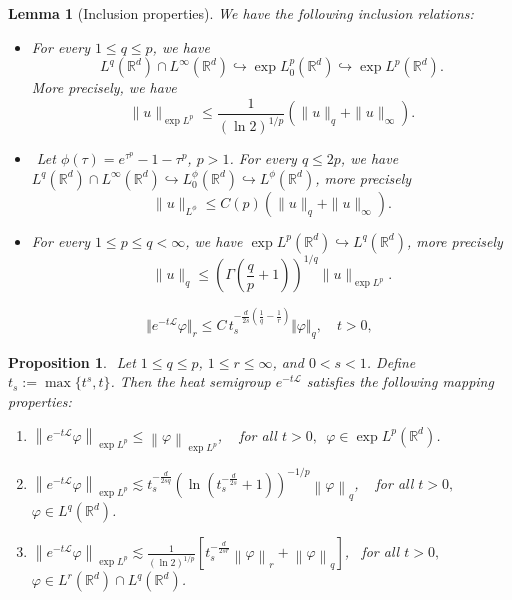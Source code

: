 \documentclass[10pt,a4paper]{amsart}
\newtheorem{lem}{Lemma}
\newtheorem{proposition}{Proposition}
\begin{document}
\begin{lem}[Inclusion properties]\label{lemma1} We have the following inclusion relations:

\begin{itemize}
\item[({1})] 
\cite[Lemma 2.3]{Majdoub2}
For every $1\leq q\leq p$, we have $$L^q(\mathbb{R}^d)\cap L^\infty(\mathbb{R}^d)\hookrightarrow \exp L^p_0(\mathbb{R}^d)\hookrightarrow \exp L^p(\mathbb{R}^d).$$ More precisely, we have 
\begin{equation}\label{eq6}
\|u\|_{\exp L^p}\leq\frac{1}{(\ln 2)^{1/p}}(\|u\|_q+\|u\|_\infty).
\end{equation}
\item[({2})] \cite[Lemma 2.3]{FK20}${}$
Let $\phi(\tau)=e^{\tau^p}-1-\tau^p$, $p>1$. For every $ q\leq 2p$, we have $L^q(\mathbb{R}^d)\cap L^\infty(\mathbb{R}^d)\hookrightarrow L^\phi_0(\mathbb{R}^d)\hookrightarrow L^\phi(\mathbb{R}^d)$, more precisely
$$
\|u\|_{ L^\phi}\leq C(p)(\|u\|_q+\|u\|_\infty).
$$
\item[({3})] \cite[Lemma 2.4]{Majdoub2}
For every $1\leq p\leq q<\infty$, we have $\exp L^p(\mathbb{R}^d)\hookrightarrow L^q(\mathbb{R}^d)$, more precisely
\begin{equation}\label{eq8}
\|u\|_q\leq\left(\Gamma\left(\frac{q}{p}+1\right)\right)^{1/q} \|u\|_{\exp L^p}.
\end{equation}
\end{itemize}
\end{lem}

\begin{equation} \label{pqbound}
\Vert e^{-t \mathcal{L}} \varphi \Vert_{r} \leq C\, t_s^{-\frac{d}{2s}(\frac{1}{q}-\frac{1}{r})}\Vert \varphi \Vert_{q},\quad t>0,
\end{equation}

\begin{proposition}\label{techprop1}${}$
Let $1\leq q\leq p$, $1\leq r\leq\infty$, and $0<s< 1$. Define $t_s:=\max\{t^s,t\}$. Then the heat semigroup $e^{-t \mathcal{L}}$ satisfies the following mapping properties:
\begin{enumerate}
\item $\left\|e^{-t\mathcal{L}} \varphi\right\|_{\exp L^p }\leq \left\|\varphi\right\|_{\exp L^p }$, \,\,\, for all $t>0,$\, $\varphi\in {\exp L^p(\mathbb{R}^d)}$.

\item $\left\|e^{-t\mathcal{L}} \varphi\right\|_{\exp L^p }\lesssim t_s^{-\frac{d}{2s q}}\left(\ln(t_s^{-\frac{d}{2s}}+1)\right)^{-1/p}\left\|\varphi\right\|_{q}$, \,\,\, for all $t>0,$\, $\varphi\in L^q(\mathbb{R}^d)$.

\item $\left\|e^{-t\mathcal{L}} \varphi\right\|_{\exp L^p}\lesssim \frac{1}{(\ln 2)^{1/p}}\left[t_s^{-\frac{d}{2s r}}\left\|\varphi\right\|_{r}+\left\|\varphi\right\|_{q}\right]$, \, for all $t>0,$\, $\varphi\in L^r(\mathbb{R}^d)\cap L^q(\mathbb{R}^d)$.
\end{enumerate}
\end{proposition}
\end{document}
